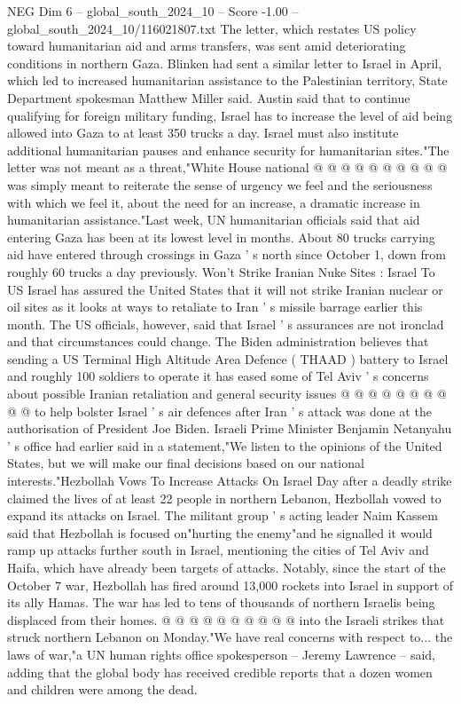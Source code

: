 \begin{textsample}{NEG Dim 6 – global\_south\_2024\_10 – Score -1.00 – global\_south\_2024\_10/116021807.txt}
The letter, which restates US policy toward humanitarian aid and arms transfers, was sent amid deteriorating conditions in northern Gaza.
Blinken had sent a similar letter to Israel in April, which led to increased humanitarian assistance to the Palestinian territory, State Department spokesman Matthew Miller said.
Austin said that to continue qualifying for foreign military funding, Israel has to increase the level of aid being allowed into Gaza to at least 350 trucks a day.
Israel must also institute additional humanitarian pauses and enhance security for humanitarian sites."The letter was not meant as a threat,"White House national @ @ @ @ @ @ @ @ @ @ was simply meant to reiterate the sense of urgency we feel and the seriousness with which we feel it, about the need for an increase, a dramatic increase in humanitarian assistance."Last week, UN humanitarian officials said that aid entering Gaza has been at its lowest level in months.
About 80 trucks carrying aid have entered through crossings in Gaza ' s north since October 1, down from roughly 60 trucks a day previously.
Won't Strike Iranian Nuke Sites : Israel To US Israel has assured the United States that it will not strike Iranian nuclear or oil sites as it looks at ways to retaliate to Iran ' s missile barrage earlier this month.
The US officials, however, said that Israel ' s assurances are not ironclad and that circumstances could change.
The Biden administration believes that sending a US Terminal High Altitude Area Defence ( THAAD ) battery to Israel and roughly 100 soldiers to operate it has eased some of Tel Aviv ' s concerns about possible Iranian retaliation and general security issues @ @ @ @ @ @ @ @ @ @ to help bolster Israel ' s air defences after Iran ' s attack was done at the authorisation of President Joe Biden.
Israeli Prime Minister Benjamin Netanyahu ' s office had earlier said in a statement,"We listen to the opinions of the United States, but we will make our final decisions based on our national interests."Hezbollah Vows To Increase Attacks On Israel Day after a deadly strike claimed the lives of at least 22 people in northern Lebanon, Hezbollah vowed to expand its attacks on Israel.
The militant group ' s acting leader Naim Kassem said that Hezbollah is focused on"hurting the enemy"and he signalled it would ramp up attacks further south in Israel, mentioning the cities of Tel Aviv and Haifa, which have already been targets of attacks.
Notably, since the start of the October 7 war, Hezbollah has fired around 13,000 rockets into Israel in support of its ally Hamas.
The war has led to tens of thousands of northern Israelis being displaced from their homes. @ @ @ @ @ @ @ @ @ @ into the Israeli strikes that struck northern Lebanon on Monday."We have real concerns with respect to... the laws of war,"a UN human rights office spokesperson -- Jeremy Lawrence -- said, adding that the global body has received credible reports that a dozen women and children were among the dead.

\end{textsample}

